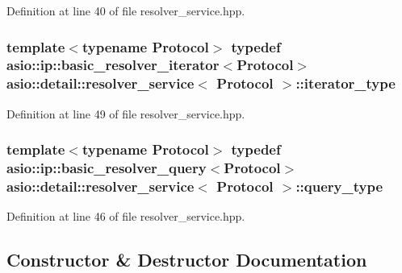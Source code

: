 Definition at line 40 of file resolver\+\_\+service.\+hpp.

\hypertarget{classasio_1_1detail_1_1resolver__service_ab9c188c775855b13d06f6682014cbf55}{}
\subsubsection[{iterator\+\_\+type}]{\setlength{\rightskip}{0pt plus 5cm}template$<$typename Protocol$>$ typedef {\bf asio\+::ip\+::basic\+\_\+resolver\+\_\+iterator}$<$Protocol$>$ {\bf asio\+::detail\+::resolver\+\_\+service}$<$ Protocol $>$\+::{\bf iterator\+\_\+type}}\label{classasio_1_1detail_1_1resolver__service_ab9c188c775855b13d06f6682014cbf55}


Definition at line 49 of file resolver\+\_\+service.\+hpp.

\hypertarget{classasio_1_1detail_1_1resolver__service_a3200fbe0279811d68ebacc1bd28d4418}{}
\subsubsection[{query\+\_\+type}]{\setlength{\rightskip}{0pt plus 5cm}template$<$typename Protocol$>$ typedef {\bf asio\+::ip\+::basic\+\_\+resolver\+\_\+query}$<$Protocol$>$ {\bf asio\+::detail\+::resolver\+\_\+service}$<$ Protocol $>$\+::{\bf query\+\_\+type}}\label{classasio_1_1detail_1_1resolver__service_a3200fbe0279811d68ebacc1bd28d4418}


Definition at line 46 of file resolver\+\_\+service.\+hpp.



\subsection{Constructor \& Destructor Documentation}
\hypertarget{classasio_1_1detail_1_1resolver__service_aef337d9c98b3ad63e5c292b00ab3d84e}{}
